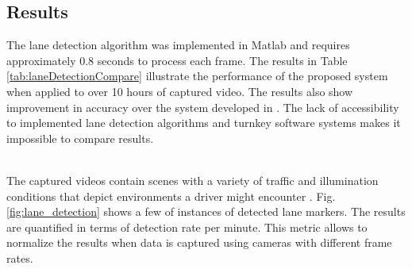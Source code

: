 \documentclass{article}
\begin{document}
\subsection{Results}
The lane detection algorithm was implemented in Matlab and requires
approximately 0.8 seconds to process each frame.
The results in Table \ref{tab:laneDetectionCompare} illustrate the performance of the proposed system when applied to over 10 hours of captured video. The results also show improvement in accuracy over the system developed in \cite{borkar_layered_2009}. The lack of accessibility to implemented lane detection algorithms and turnkey software systems makes it impossible to compare results.
\begin{table}[htb!]
\caption{Accuracy of the lane detection system}
\label{tab:laneDetectionCompare}
\end{table}\\
The captured videos contain scenes with a variety of traffic and illumination conditions that depict environments a driver might encounter \cite{borkar_layered_2009}. Fig. \ref{fig:lane_detection} shows a few of instances of detected lane markers.
The results are quantified in terms of detection rate per minute. This metric allows to normalize the results when data is captured using cameras with different frame rates.
\end{document}
